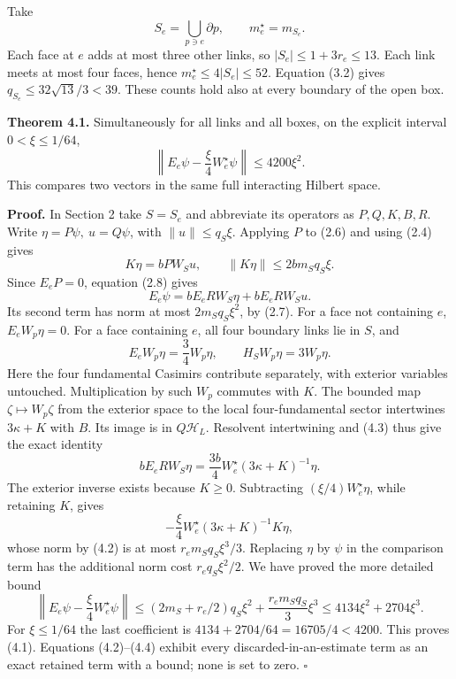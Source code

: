 \documentclass[
]{article}
\begin{document}
Take \[
S_e=\bigcup_{p\ni e}\partial p,\qquad m_e^{\star}=m_{S_e}.
\] Each face at \(e\) adds at most three other links, so
\(|S_e|\le1+3r_e\le13\). Each link meets at most four faces, hence
\(m_e^{\star}\le4|S_e|\le52\). Equation (3.2) gives
\(q_{S_e}\le32\sqrt{13}/3<39\). These counts hold also at every boundary
of the open box.

\textbf{Theorem 4.1.} Simultaneously for all links and all boxes, on the
explicit interval \(0<\xi\le1/64\), \[
\left\|E_e\psi-\frac\xi4W_e^{\star}\psi\right\|
 \le4200\xi^2.                                                 \tag{4.1}
\] This compares two vectors in the same full interacting Hilbert space.

\textbf{Proof.} In Section 2 take \(S=S_e\) and abbreviate its operators
as \(P,Q,K,B,R\). Write \(\eta=P\psi,\ u=Q\psi\), with
\(\|u\|\le q_S\xi\). Applying \(P\) to (2.6) and using (2.4) gives \[
K\eta=bPW_Su,\qquad \|K\eta\|\le2bm_Sq_S\xi.                 \tag{4.2}
\] Since \(E_eP=0\), equation (2.8) gives \[
E_e\psi=bE_eRW_S\eta+bE_eRW_Su.                               \tag{4.3}
\] Its second term has norm at most \(2m_Sq_S\xi^2\), by (2.7). For a
face not containing \(e\), \(E_eW_p\eta=0\). For a face containing
\(e\), all four boundary links lie in \(S\), and \[
E_eW_p\eta=\frac34W_p\eta,\qquad H_SW_p\eta=3W_p\eta.
\] Here the four fundamental Casimirs contribute separately, with
exterior variables untouched. Multiplication by such \(W_p\) commutes
with \(K\). The bounded map \(\zeta\mapsto W_p\zeta\) from the exterior
space to the local four-fundamental sector intertwines \(3\kappa+K\)
with \(B\). Its image is in \(Q\mathcal H_L\). Resolvent intertwining
and (4.3) thus give the exact identity \[
bE_eRW_S\eta=\frac{3b}{4}
 W_e^{\star}(3\kappa+K)^{-1}\eta.
\] The exterior inverse exists because \(K\ge0\). Subtracting
\((\xi/4)W_e^{\star}\eta\), while retaining \(K\), gives \[
-\frac\xi4W_e^{\star}(3\kappa+K)^{-1}K\eta,
\] whose norm by (4.2) is at most \(r_em_Sq_S\xi^3/3\). Replacing
\(\eta\) by \(\psi\) in the comparison term has the additional norm cost
\(r_eq_S\xi^2/2\). We have proved the more detailed bound \[
\left\|E_e\psi-\frac\xi4W_e^{\star}\psi\right\|
\le (2m_S+r_e/2)q_S\xi^2
       +\frac{r_em_Sq_S}{3}\xi^3
\le4134\xi^2+2704\xi^3.                                      \tag{4.4}
\] For \(\xi\le1/64\) the last coefficient is
\(4134+2704/64=16705/4<4200\). This proves (4.1). Equations (4.2)--(4.4)
exhibit every discarded-in-an-estimate term as an exact retained term
with a bound; none is set to zero. \(\square\)
\end{document}
